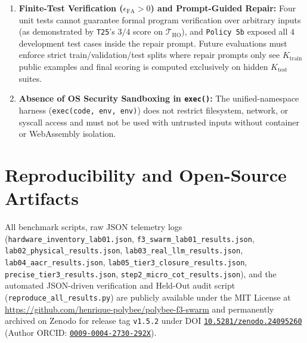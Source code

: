 \documentclass[10pt,a4paper]{article}
\begin{document}
\begin{enumerate}
    \item \textbf{Finite-Test Verification ($\epsilon_{\text{FA}} > 0$) and Prompt-Guided Repair:} Four unit tests cannot guarantee formal program verification over arbitrary inputs (as demonstrated by \texttt{T25}'s $3/4$ score on $\mathcal{T}_{\text{HO}}$), and \texttt{Policy 5b} exposed all $4$ development test cases inside the repair prompt. Future evaluations must enforce strict train/validation/test splits where repair prompts only see $K_{\text{train}}$ public examples and final scoring is computed exclusively on hidden $K_{\text{test}}$ suites.
    \item \textbf{Absence of OS Security Sandboxing in \texttt{exec()}:} The unified-namespace harness (\texttt{exec(code, env, env)}) does not restrict filesystem, network, or syscall access and must not be used with untrusted inputs without container or WebAssembly isolation.
\end{enumerate}

\section*{Reproducibility and Open-Source Artifacts}
All benchmark scripts, raw JSON telemetry logs (\texttt{hardware\_inventory\_lab01.json}, \texttt{f3\_swarm\_lab01\_results.json}, \texttt{lab02\_physical\_results.json}, \texttt{lab03\_real\_llm\_results.json}, \texttt{lab04\_aacr\_results.json}, \texttt{lab05\_tier3\_closure\_results.json}, \texttt{precise\_tier3\_results.json}, \texttt{step2\_micro\_cot\_results.json}), and the automated JSON-driven verification and Held-Out audit script (\texttt{reproduce\_all\_results.py}) are publicly available under the MIT License at \url{https://github.com/henrique-polybee/polybee-f3-swarm} and permanently archived on Zenodo for release tag \texttt{v1.5.2} under DOI \href{https://doi.org/10.5281/zenodo.24095260}{\texttt{10.5281/zenodo.24095260}} (Author ORCID: \href{https://orcid.org/0009-0004-2730-292X}{\texttt{0009-0004-2730-292X}}).
\end{document}
